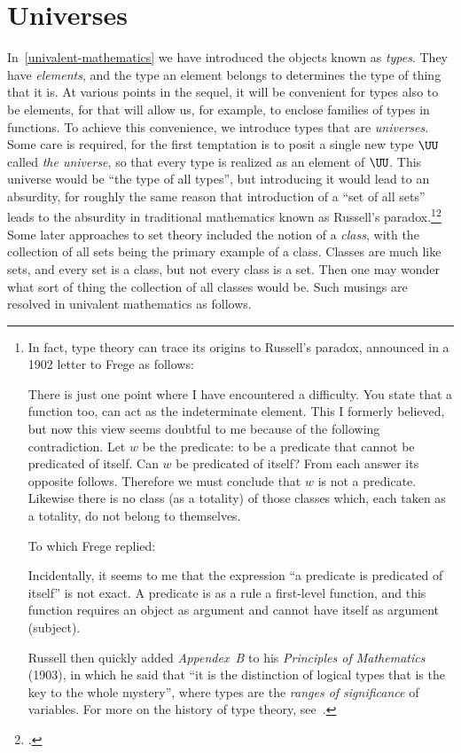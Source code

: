 \section{Universes}
\label{sec:universes}

In~\cref{univalent-mathematics} we have introduced the objects known as \emph{types}.  They have \emph{elements}, and the type an
element belongs to determines the type of thing that it is.  At various points in the sequel, it will be convenient for types also to be
elements, for that will allow us, for example, to enclose families of types in functions.  To achieve this
convenience, we introduce types that are \emph{universes}.  Some care is required, for the first temptation is to posit a
single new type $\UU$ called \emph{the universe}, so that every type is realized as an element of $\UU$.  This universe would be ``the type of
all types'', but introducing it would lead to an absurdity, for roughly the same reason that introduction of a ``set of all sets'' leads to the absurdity
in traditional mathematics known as Russell's paradox.\footnote{%
  In fact, type theory can trace its origins to Russell's paradox,
  announced in a 1902 letter to Frege as follows:\\
  \begin{adjustwidth}{\parindent}{}
    There is just one point where I have encountered a difficulty.
    You state that a function too, can act as the indeterminate element.
    This I formerly believed,
    but now this view seems doubtful to me because of the following contradiction.
    Let $w$ be the predicate: to be a predicate that cannot be predicated of itself.
    Can $w$ be predicated of itself? From each answer its opposite follows.
    Therefore we must conclude that $w$ is not a predicate.
    Likewise there is no class (as a totality) of those classes which,
    each taken as a totality, do not belong to themselves.
  \end{adjustwidth}
  To which Frege replied:
  \begin{adjustwidth}{\parindent}{}
  Incidentally, it seems to me that the expression
  ``a predicate is predicated of itself'' is not exact.
  A predicate is as a rule a first-level function,
  and this function requires an object as argument
  and cannot have itself as argument (subject).
  \end{adjustwidth}
  Russell then quickly added \emph{Appendex~B} to his
  \emph{Principles of Mathematics} (1903), in which he said that
  ``it is the distinction of logical types that is the key to the whole mystery'',
  where types are the \emph{ranges of significance} of variables.
  For more on the history of type theory,
  see~\citeauthor{sep-type-theory}\footnotemark{}.}\footcitetext{sep-type-theory}
  Some later approaches to set theory included the notion of a \emph{class}, with the collection of all sets being the primary example of a class.
  Classes are much like sets, and every set is a class, but not every class is a set.
  Then one may wonder what sort of thing the collection of all classes would be.  Such
  musings are resolved in univalent mathematics as follows.

